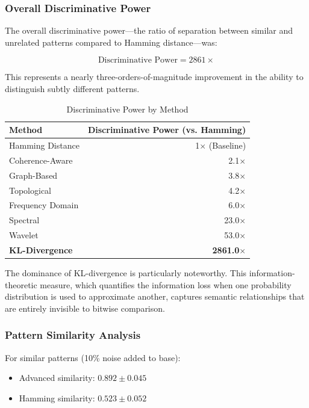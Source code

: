 \documentclass[12pt, a4paper]{article}
\begin{document}
\subsubsection{Overall Discriminative Power}

The overall discriminative power—the ratio of separation between similar and unrelated patterns compared to Hamming distance—was:

\begin{equation}
\text{Discriminative Power} = 2861\times
\end{equation}

This represents a nearly three-orders-of-magnitude improvement in the ability to distinguish subtly different patterns.

\begin{table}[H]
\centering
\caption{Discriminative Power by Method}
\label{tab:hex_power}
\begin{tabular}{@{}lr@{}}
\toprule
\textbf{Method} & \textbf{Discriminative Power (vs. Hamming)} \\
\midrule
Hamming Distance & 1$\times$ (Baseline) \\
Coherence-Aware & 2.1$\times$ \\
Graph-Based & 3.8$\times$ \\
Topological & 4.2$\times$ \\
Frequency Domain & 6.0$\times$ \\
Spectral & 23.0$\times$ \\
Wavelet & 53.0$\times$ \\
\textbf{KL-Divergence} & \textbf{2861.0$\times$} \\
\bottomrule
\end{tabular}
\end{table}

The dominance of KL-divergence is particularly noteworthy. This information-theoretic measure, which quantifies the information loss when one probability distribution is used to approximate another, captures semantic relationships that are entirely invisible to bitwise comparison.

\subsubsection{Pattern Similarity Analysis}

For similar patterns (10\% noise added to base):
\begin{itemize}
    \item Advanced similarity: $0.892 \pm 0.045$
    \item Hamming similarity: $0.523 \pm 0.052$
\end{itemize}
\end{document}
